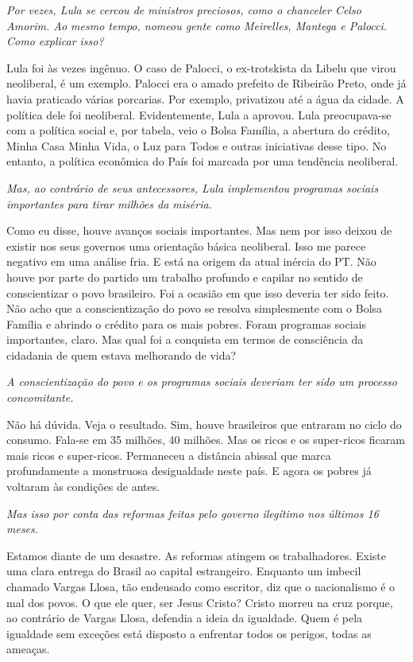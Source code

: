 \itshape
Por vezes, Lula se cercou de ministros preciosos, como
o chanceler Celso Amorim. Ao mesmo tempo, nomeou gente como Meirelles,
Mantega e Palocci. Como explicar isso?

\normalfont 
Lula foi às vezes ingênuo. O caso de Palocci, o
ex-trotskista da Libelu que virou neoliberal, é um exemplo. Palocci era
o amado prefeito de Ribeirão Preto, onde já havia praticado várias
porcarias. Por exemplo, privatizou até a água da cidade. A política dele
foi neoliberal. Evidentemente, Lula a aprovou. Lula preocupava-se com a
política social e, por tabela, veio o Bolsa Família, a abertura do
crédito, Minha Casa Minha Vida, o Luz para Todos e outras iniciativas
desse tipo. No entanto, a política econômica do País foi marcada por uma
tendência neoliberal.

\itshape
Mas, ao contrário de seus antecessores, Lula
implementou programas sociais importantes para tirar milhões da miséria.

\normalfont 
Como eu disse, houve avanços sociais importantes. Mas nem
por isso deixou de existir nos seus governos uma orientação básica
neoliberal. Isso me parece negativo em uma análise fria. E está na
origem da atual inércia do PT. Não houve por parte do partido um
trabalho profundo e capilar no sentido de conscientizar o povo
brasileiro. Foi a ocasião em que isso deveria ter sido feito. Não acho
que a conscientização do povo se resolva simplesmente com o Bolsa
Família e abrindo o crédito para os mais pobres. Foram programas sociais
importantes, claro. Mas qual foi a conquista em termos de consciência da
cidadania de quem estava melhorando de vida?

\itshape
A conscientização do povo e os programas sociais
deveriam ter sido um processo concomitante.

\normalfont 
Não há dúvida. Veja o resultado. Sim, houve brasileiros
que entraram no ciclo do consumo. Fala-se em 35 milhões, 40 milhões. Mas
os ricos e os super-ricos ficaram mais ricos e super-ricos. Permaneceu a
distância abissal que marca profundamente a monstruosa desigualdade
neste país. E agora os pobres já voltaram às condições de antes.

\itshape
Mas isso por conta das reformas feitas pelo governo
ilegítimo nos últimos 16 meses.

\normalfont 
Estamos diante de um desastre. As reformas atingem os
trabalhadores. Existe uma clara entrega do Brasil ao capital
estrangeiro. Enquanto um imbecil chamado Vargas Llosa, tão endeusado
como escritor, diz que o nacionalismo é o mal dos povos. O que ele quer,
ser Jesus Cristo? Cristo morreu na cruz porque, ao contrário de Vargas
Llosa, defendia a ideia da igualdade. Quem é pela igualdade sem exceções
está disposto a enfrentar todos os perigos, todas as ameaças.

